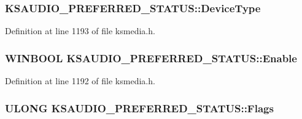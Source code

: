 \subsubsection[{\texorpdfstring{Device\+Type}{DeviceType}}]{ K\+S\+A\+U\+D\+I\+O\+\_\+\+P\+R\+E\+F\+E\+R\+R\+E\+D\+\_\+\+S\+T\+A\+T\+U\+S\+::\+Device\+Type}\hypertarget{struct_k_s_a_u_d_i_o___p_r_e_f_e_r_r_e_d___s_t_a_t_u_s_aad808725ceafbd1588499d1ebd16a953}{}\label{struct_k_s_a_u_d_i_o___p_r_e_f_e_r_r_e_d___s_t_a_t_u_s_aad808725ceafbd1588499d1ebd16a953}


Definition at line 1193 of file ksmedia.\+h.

\subsubsection[{\texorpdfstring{Enable}{Enable}}]{\setlength{\rightskip}{0pt plus 5cm}W\+I\+N\+B\+O\+OL K\+S\+A\+U\+D\+I\+O\+\_\+\+P\+R\+E\+F\+E\+R\+R\+E\+D\+\_\+\+S\+T\+A\+T\+U\+S\+::\+Enable}\hypertarget{struct_k_s_a_u_d_i_o___p_r_e_f_e_r_r_e_d___s_t_a_t_u_s_a191f968e80d543b357a666ea457ba491}{}\label{struct_k_s_a_u_d_i_o___p_r_e_f_e_r_r_e_d___s_t_a_t_u_s_a191f968e80d543b357a666ea457ba491}


Definition at line 1192 of file ksmedia.\+h.

\subsubsection[{\texorpdfstring{Flags}{Flags}}]{\setlength{\rightskip}{0pt plus 5cm}U\+L\+O\+NG K\+S\+A\+U\+D\+I\+O\+\_\+\+P\+R\+E\+F\+E\+R\+R\+E\+D\+\_\+\+S\+T\+A\+T\+U\+S\+::\+Flags}\hypertarget{struct_k_s_a_u_d_i_o___p_r_e_f_e_r_r_e_d___s_t_a_t_u_s_a51f37479f079de3d781a3f278db8f553}{}\label{struct_k_s_a_u_d_i_o___p_r_e_f_e_r_r_e_d___s_t_a_t_u_s_a51f37479f079de3d781a3f278db8f553}


